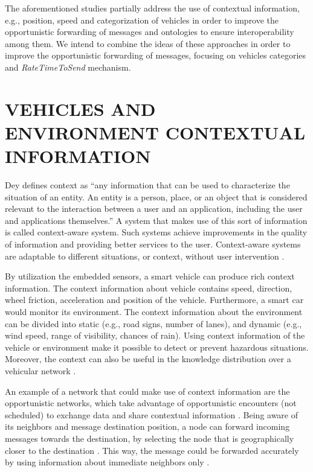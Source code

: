 \documentclass[letterpaper, 10 pt, conference]{ieeeconf}  %
\begin{document}
The aforementioned studies partially address the use of contextual information, e.g., position, speed and categorization of vehicles in order to improve the opportunistic forwarding of messages and ontologies to ensure interoperability among them. We intend to combine the ideas of these approaches in order to improve the opportunistic forwarding of messages, focusing on vehicles categories and \emph{RateTimeToSend} mechanism.

\section{VEHICLES AND ENVIRONMENT CONTEXTUAL INFORMATION}

Dey \cite{dey2001} defines context as “any information that can be used to characterize the situation of an entity. An entity is a person, place, or an object that is considered relevant to the interaction between a user and an application, including the user and applications themselves.” A system that makes use of this sort of information is called context-aware system. Such systems achieve improvements in the quality of information and providing better services to the user. Context-aware systems are adaptable to  different situations, or context, without user intervention \cite{baldauf2007}.

By utilization the embedded sensors, a smart vehicle can produce rich context information. The context information about vehicle contains speed, direction, wheel friction, acceleration and position of the vehicle. Furthermore, a smart car would monitor its environment. The context information about the environment can be divided into static (e.g., road signs, number of lanes), and dynamic (e.g., wind speed, range of visibility, chances of rain). Using context information of the vehicle or environment make it possible to detect or prevent hazardous situations. Moreover, the context can also be useful in the knowledge distribution over a vehicular network \cite{tocadas2010}.

An example of a network that could make use of context information are the opportunistic networks, which take advantage of opportunistic encounters (not scheduled) to exchange data and share contextual information  \cite{geoopp2014}. Being aware of its neighbors and message destination position, a node can forward incoming messages towards the destination, by selecting the node that is geographically closer to the destination \cite{gpsr2000}. This way, the message could be forwarded accurately by using information about immediate neighbors only \cite{magf2009}.
\end{document}

